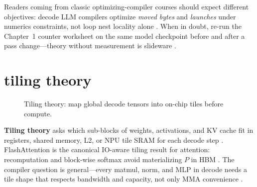 Readers coming from classic optimizing-compiler courses should expect different objectives: decode LLM compilers optimize \emph{moved bytes} and \emph{launches} under numerics constraints, not loop nest locality alone \citep{taxbreak2026,memoryfloor2026,patel2025llminference,dao2022flashattention,yirage2026,chen2020compilerbasedhardw,dlbook}. When in doubt, re-run the Chapter~1 counter worksheet on the same model checkpoint before and after a pass change---theory without measurement is slideware \citep{patel2025llminference,taxbreak2026,memoryfloor2026,semianalysis2024tma,yirage2026,chen2020compilerbasedhardw,kwon2023vllm,liu2024deepseekv3,dao2022flashattention,dao2023flashdecoding,dlbook}.

\section{tiling theory}
\label{sec:ch13_tiling_theory}


\begin{figure}[t]
\centering
{}
\caption{Tiling theory: map global decode tensors into on-chip tiles before compute.}
\label{fig:tiling_theory_pipeline}
\end{figure}

\textbf{Tiling theory} asks which sub-blocks of weights, activations, and KV cache fit in registers, shared memory, L2, or NPU tile SRAM for each decode step \citep{dao2022flashattention,semianalysis2024tma,nvidia2022hopper}. FlashAttention is the canonical IO-aware tiling result for attention: recomputation and block-wise softmax avoid materializing $P$ in HBM \citep{dao2022flashattention,dao2023flashdecoding}. The compiler question is general---every matmul, norm, and MLP in decode needs a tile shape that respects bandwidth and capacity, not only MMA convenience \citep{patel2025llminference,memoryfloor2026,taxbreak2026}.

